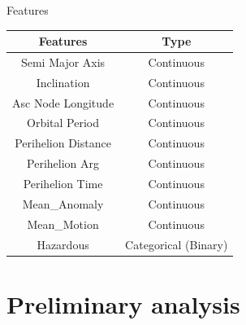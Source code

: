 \documentclass{beamer}
\begin{document}
\begin{frame}{Features}
\begin{table}[]
\begin{center}
\begin{tabular}{c|c}
\hline
\textbf{Features}             & \textbf{Type}        \\ \hline
Semi Major Axis               & Continuous           \\ \hline
Inclination                   & Continuous           \\ \hline
Asc Node Longitude            & Continuous           \\ \hline
Orbital Period                & Continuous           \\ \hline
Perihelion Distance           & Continuous           \\ \hline
Perihelion Arg                & Continuous           \\ \hline
Perihelion Time               & Continuous           \\ \hline
Mean\_Anomaly                 & Continuous           \\ \hline
Mean\_Motion                  & Continuous           \\ \hline
Hazardous                     & Categorical (Binary)
\end{tabular}
\end{center}
\label{tab_features}
\end{table}

\end{frame}


\section{Preliminary analysis}
\end{document}
